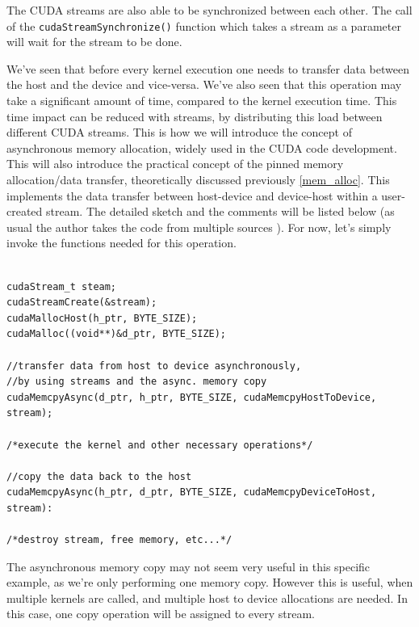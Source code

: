 \documentclass[12pt]{article}
\begin{document}
The CUDA streams are also able to be synchronized between each other. 
The call of the \verb|cudaStreamSynchronize()| function which takes a stream as a parameter will wait for the stream to be done.

We've seen that before every kernel execution one needs to transfer data between the host and the device and vice-versa. 
We've also seen that this operation may take a significant amount of time, compared to the kernel execution time. 
This time impact can be reduced with streams, by distributing this load between different CUDA streams. 
This is how we will introduce the concept of asynchronous memory allocation, widely used in the CUDA code development.
This will also introduce the practical concept of the pinned memory allocation/data transfer, 
theoretically discussed previously \ref{mem_alloc}. This implements the data transfer between host-device and device-host
within a user-created stream.
The detailed sketch and the comments will be listed below (as usual the author takes the code
from multiple sources \cite{center}). For now, let's simply invoke the 
functions needed for this operation. 

\begin{verbatim}

cudaStream_t steam;
cudaStreamCreate(&stream);
cudaMallocHost(h_ptr, BYTE_SIZE);
cudaMalloc((void**)&d_ptr, BYTE_SIZE);

//transfer data from host to device asynchronously,
//by using streams and the async. memory copy
cudaMemcpyAsync(d_ptr, h_ptr, BYTE_SIZE, cudaMemcpyHostToDevice, stream);

/*execute the kernel and other necessary operations*/

//copy the data back to the host
cudaMemcpyAsync(h_ptr, d_ptr, BYTE_SIZE, cudaMemcpyDeviceToHost, stream):

/*destroy stream, free memory, etc...*/

\end{verbatim}

The asynchronous memory copy may not seem very useful in this specific example,
as we're only performing one memory copy. However this is useful, when multiple kernels are called, and multiple 
host to device allocations are needed. In this case, one copy operation will be assigned to every stream.







%
\end{document}
